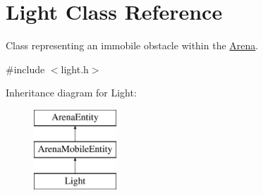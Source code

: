 \hypertarget{class_light}{}\section{Light Class Reference}
\label{class_light}


Class representing an immobile obstacle within the \mbox{\hyperlink{class_arena}{Arena}}.  




{\ttfamily \#include $<$light.\+h$>$}

Inheritance diagram for Light\+:\begin{figure}[H]
\begin{center}
\leavevmode
\includegraphics[height=3.000000cm]{class_light}
\end{center}
\end{figure}
